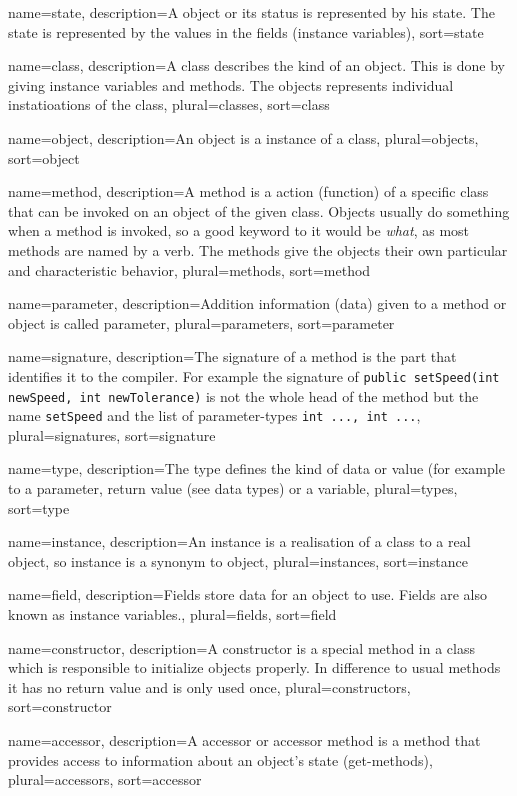 {
	name=state,
	description={A object or its status is represented by his state.
		The state is represented by the values in the fields
		(instance variables)},
	sort=state
}


{
	name=class,
	description={A class describes the kind of an object. This is done
		by giving instance variables and methods. The objects 
		represents individual instatioations of the class},
	plural=classes,
	sort=class
}

{
	name=object,
	description={An object is a instance of a class},
	plural=objects,
	sort=object
}

{
	name=method,
	description={A method is a action (function) of a specific class that
		can be invoked on an object of the given class. Objects usually
		do something when a method is invoked, so a good keyword to it
		would be \textit{what}, as most methods are named by a verb.
		The methods give the objects their own particular and
		characteristic behavior},
	plural=methods,
	sort=method
}

{
	name=parameter,
	description={Addition information (data) given to a method or object
		is called parameter},
	plural=parameters,
	sort=parameter
}

{
	name=signature,
	description={The signature of a method is the part that identifies 
		it to the compiler. For example the signature of 
		\lstinline{public setSpeed(int newSpeed, int newTolerance)}
		is not the whole head of the method but the name 
		\lstinline{setSpeed} and the list of parameter-types 
		\lstinline{int ..., int ...}},
	plural=signatures,
	sort=signature
}

{
	name=type,
	description={The type defines the kind of data or value (for example 
		to a parameter, return value (see data types) or a variable},
	plural=types,
	sort=type
}

{
	name=instance,
	description={An instance is a realisation of a class to a real object,
		so instance is a synonym to object},
	plural=instances,
	sort=instance
}

{
	name=field,
	description={Fields store data for an object to use. Fields are also
		known as instance variables.},
	plural=fields,
	sort=field
}

{
	name=constructor,
	description={A constructor is a special method in a class which is
		responsible to initialize objects properly. In difference to
		usual methods it has no return value and is only used once},
	plural=constructors,
	sort=constructor
}

{
	name=accessor,
	description={A accessor or accessor method is a method that provides
		access to information about an object's state (get-methods)},
	plural=accessors,
	sort=accessor
}
